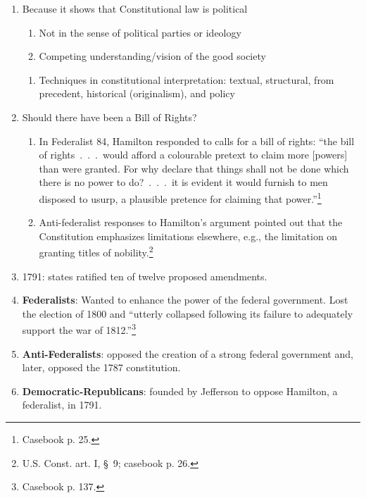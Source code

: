 \begin{enumerate}
\begin{enumerate}
\end {enumerate}
    \begin{enumerate} Important to understand Constitutional law in context
    \item Because it shows that Constitutional law is political
\begin{enumerate} 
    \item Not in the sense of political parties or ideology
    \item Competing understanding/vision of the good society
    \end{enumerate}
    \begin{enumerate}
    \item Techniques in constitutional interpretation: textual, structural, from precedent, historical (originalism), and policy
    \end{enumerate}
    \item Should there have been a Bill of Rights?
    \begin{enumerate}
        \item In Federalist 84, Hamilton responded to calls for a bill of 
        rights: ``the bill of rights~.~.~.~would afford a colourable pretext 
        to claim more [powers] than were granted. For why declare that things 
        shall not be done which there is no power to do?~.~.~.~it is evident 
        it would furnish to men disposed to usurp, a plausible pretence for 
        claiming that power.''\footnote{Casebook p. 25.}
        \item Anti-federalist responses to Hamilton's argument pointed out 
        that the Constitution emphasizes limitations elsewhere, e.g., the 
        limitation on granting titles of nobility.\footnote{U.S. Const. art. 
        I, \S\ 9; casebook p. 26.}
    \end{enumerate}
    \item 1791: states ratified ten of twelve proposed amendments.
    \item \textbf{Federalists}: Wanted to enhance the power of the federal 
    government.  Lost the election of 1800 and ``utterly collapsed following 
    its failure to adequately support the war of 1812.''\footnote{Casebook p. 
    137.}
    \item \textbf{Anti-Federalists}: opposed the creation of a strong federal 
    government and, later, opposed the 1787 constitution.
    \item \textbf{Democratic-Republicans}: founded by Jefferson to oppose 
    Hamilton, a federalist, in 1791.

\end{enumerate}
\end{enumerate}
